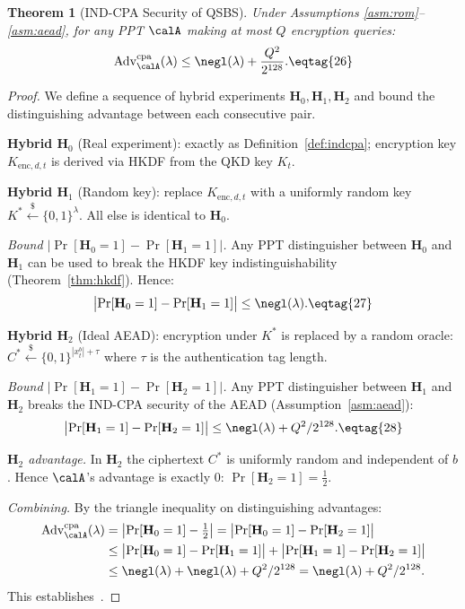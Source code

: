 \documentclass[11pt,letterpaper]{article}
\newtheorem{theorem}{Theorem}[section]
\begin{document}
\begin{theorem}[IND-CPA Security of QSBS]\label{thm:indcpa}
Under Assumptions \ref{asm:rom}--\ref{asm:aead},
for any PPT $\calA$ making at most $Q$ encryption queries:
\[
  \mathrm{Adv}^\mathrm{cpa}_\calA(\lambda)
  \leq \negl(\lambda) + \frac{Q^2}{2^{128}}. \eqtag{26}
\]
\end{theorem}

\begin{proof}
We define a sequence of hybrid experiments $\mathbf{H}_0, \mathbf{H}_1, \mathbf{H}_2$
and bound the distinguishing advantage between each consecutive pair.

\medskip
\textbf{Hybrid $\mathbf{H}_0$} (Real experiment): exactly as
Definition~\ref{def:indcpa}; encryption key $K_{\mathrm{enc},d,t}$ is
derived via HKDF from the QKD key $K_t$.

\medskip
\textbf{Hybrid $\mathbf{H}_1$} (Random key): replace $K_{\mathrm{enc},d,t}$
with a uniformly random key $K^* \xleftarrow{\$}\{0,1\}^\lambda$.
All else is identical to $\mathbf{H}_0$.

\textit{Bound $|\Pr[\mathbf{H}_0=1] - \Pr[\mathbf{H}_1=1]|$.}
Any PPT distinguisher between $\mathbf{H}_0$ and $\mathbf{H}_1$ can be used
to break the HKDF key indistinguishability (Theorem~\ref{thm:hkdf}).
Hence:
\[
  \bigl|\Pr[\mathbf{H}_0=1] - \Pr[\mathbf{H}_1=1]\bigr| \leq \negl(\lambda).
\eqtag{27}
\]

\medskip
\textbf{Hybrid $\mathbf{H}_2$} (Ideal AEAD): encryption under $K^*$ is
replaced by a random oracle: $C^* \xleftarrow{\$}\{0,1\}^{|x_t^b|+\tau}$
where $\tau$ is the authentication tag length.

\textit{Bound $|\Pr[\mathbf{H}_1=1] - \Pr[\mathbf{H}_2=1]|$.}
Any PPT distinguisher between $\mathbf{H}_1$ and $\mathbf{H}_2$ breaks the
IND-CPA security of the AEAD (Assumption~\ref{asm:aead}):
\[
  \bigl|\Pr[\mathbf{H}_1=1] - \Pr[\mathbf{H}_2=1]\bigr|
    \leq \negl(\lambda) + Q^2/2^{128}. \eqtag{28}
\]

\textit{$\mathbf{H}_2$ advantage.}
In $\mathbf{H}_2$ the ciphertext $C^*$ is uniformly random and independent
of $b$. Hence $\calA$'s advantage is exactly 0:
$\Pr[\mathbf{H}_2=1] = \tfrac{1}{2}$.

\medskip
\textit{Combining.} By the triangle inequality on distinguishing advantages:
\begin{align*}
  \mathrm{Adv}^\mathrm{cpa}_\calA(\lambda)
    &= \bigl|\Pr[\mathbf{H}_0=1] - \tfrac{1}{2}\bigr|
     = \bigl|\Pr[\mathbf{H}_0=1] - \Pr[\mathbf{H}_2=1]\bigr|\\
    &\leq \bigl|\Pr[\mathbf{H}_0=1]-\Pr[\mathbf{H}_1=1]\bigr|
         + \bigl|\Pr[\mathbf{H}_1=1]-\Pr[\mathbf{H}_2=1]\bigr|\\
    &\leq \negl(\lambda) + \negl(\lambda) + Q^2/2^{128}
     = \negl(\lambda) + Q^2/2^{128}.
\end{align*}
This establishes~.
\end{proof}
\end{document}
